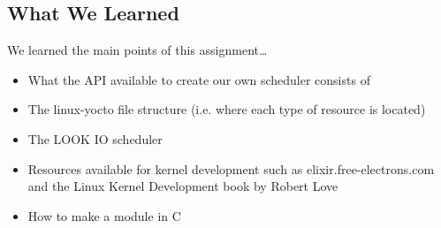 \documentclass[draftclsnofoot, onecolumn, 10pt, compsoc]{IEEEtran}
\begin{document}
		\subsection{What We Learned}
			We learned the main points of this assignment\dots
				\begin{itemize}
					\item What the API available to create our own scheduler consists of
					\item The linux-yocto file structure (i.e. where each type of resource is located)
					\item The LOOK IO scheduler
					\item Resources available for kernel development such as elixir.free-electrons.com and the Linux Kernel Development book by Robert Love
					\item How to make a module in C
				\end{itemize}
			
\end{document}
